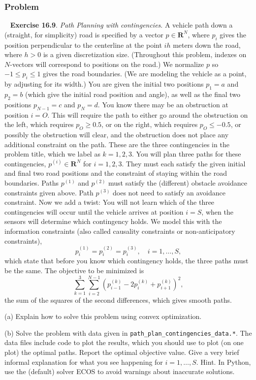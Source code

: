 \documentclass[12pt,reqno]{article}
\theoremstyle{definition}
\numberwithin{equation}{section}
\begin{document}
\subsubsection*{Problem}
~\cite{EE364a-extra} \textbf{Exercise 16.9}. \textit{Path Planning with contingencies}.
A vehicle path down a (straight, for simplicity) road is specified
by a vector $p \in \mathbf{R}^N$, where $p_i$ gives the position perpendicular to the centerline at the point $i h$ meters down the road, where $h>0$ is a given discretization size. (Throughout this problem, indexes on $N$-vectors will correspond to positions on the road.)
We normalize $p$ so $-1 \leq p_i \leq 1$ gives the road boundaries. (We are modeling the vehicle as a point, by adjusting for its width.)
You are
given the initial two positions $p_1=a$ and $p_2=b$ (which give the initial road position and angle), as well as the final two positions $p_{N-1}=c$ and $p_N=d$.
You know there may be an obstruction at position $i=O$. This will require the path to either go around the obstruction on the left, which requires $p_O \geq 0.5$,
or on the right, which requires $p_O \leq-0.5$, or possibly the obstruction will clear, and the obstruction does not place any additional constraint on the path.
These are the three contingencies in the problem title, which we label as $k=1,2,3$.
You will plan three paths for these contingencies, $p^{(i)} \in \mathbf{R}^N$ for $i=1,2,3$.
They must each satisfy the given initial and final two road positions and the constraint of staying within the road boundaries.
Paths $p^{(1)}$ and $p^{(2)}$ must satisfy the (different) obstacle avoidance constraints given above. Path $p^{(3)}$ does not need to satisfy an avoidance constraint.
Now we add a twist: You will not learn which of the three contingencies will occur until the vehicle arrives at position $i=S$, when the sensors will determine which contingency holds.
We model this with the information constraints (also called causality constraints or non-anticipatory constraints),
\[
p_i^{(1)}=p_i^{(2)}=p_i^{(3)}, \quad i=1, \ldots, S,
\]
which state that before you know which contingency holds, the three paths must be the same.
The objective to be minimized is
\[
\sum_{k=1}^3 \sum_{i=2}^{N-1}\left(p_{i-1}^{(k)}-2 p_i^{(k)}+p_{i+1}^{(k)}\right)^2,
\]
the sum of the squares of the second differences, which gives smooth paths.

\vspace{0.1cm}
\noindent (a) Explain how to solve this problem using convex optimization.

\vspace{0.1cm}
\noindent (b) Solve the problem with data given in \lstinline|path_plan_contingencies_data.*|. The data files include code to plot the results,
which you should use to plot (on one plot) the optimal paths.
Report the optimal objective value. Give a very brief informal explanation for what you see happening for $i=1, \ldots, S$.
Hint. In Python, use the (default) solver ECOS to avoid warnings about inaccurate solutions.
\end{document}
